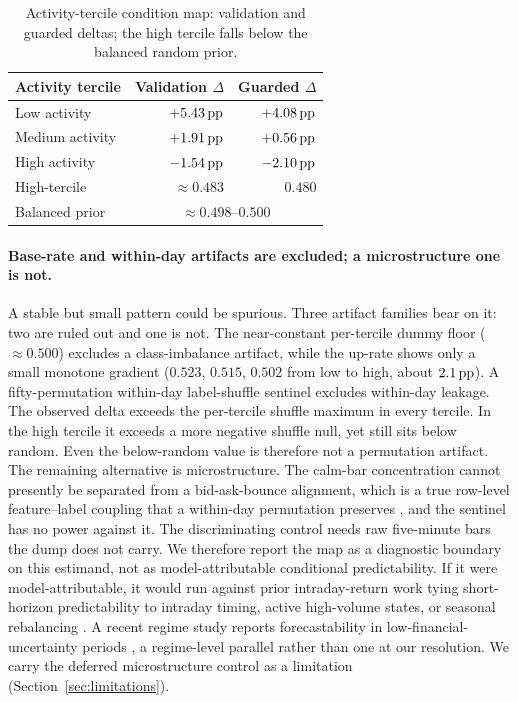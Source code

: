 \begin{table}[t]
  \centering
  \caption{Activity-tercile condition map: validation and guarded \macrofone{}
  deltas; the high tercile falls below the balanced random prior.}
  \label{tab:tercile}
  \begin{tabular}{lrr}
    \toprule
    Activity tercile & Validation $\Delta$ & Guarded $\Delta$ \\
    \midrule
    Low activity    & $+5.43\,\textrm{pp}$ & $+4.08\,\textrm{pp}$ \\
    Medium activity & $+1.91\,\textrm{pp}$ & $+0.56\,\textrm{pp}$ \\
    High activity   & $-1.54\,\textrm{pp}$ & $-2.10\,\textrm{pp}$ \\
    \midrule
    High-tercile \macrofone{} & $\approx 0.483$ & $0.480$ \\
    Balanced prior & \multicolumn{2}{c}{$\approx 0.498$--$0.500$} \\
    \bottomrule
  \end{tabular}
\end{table}

\paragraph{Base-rate and within-day artifacts are excluded; a microstructure one is not.}
A stable but small pattern could be spurious. Three artifact families bear on it:
two are ruled out and one is not. The
near-constant per-tercile dummy floor ($\approx 0.500$) excludes a class-imbalance
artifact, while the up-rate shows only a small monotone gradient ($0.523$, $0.515$,
$0.502$ from low to high, about $2.1\,\textrm{pp}$). A fifty-permutation within-day label-shuffle sentinel
excludes within-day leakage. The observed delta exceeds the per-tercile shuffle
maximum in every tercile. In the high tercile it exceeds a more negative shuffle
null, yet still sits below random. Even the below-random value is
therefore not a permutation artifact. The remaining alternative is microstructure. The
calm-bar concentration cannot presently be separated from a bid-ask-bounce
alignment, which is a true row-level feature--label coupling that a within-day
permutation preserves \cite{roll1984simple,lo1990nonsynchronous}, and the
sentinel has no power against it. The discriminating control needs raw five-minute
bars the dump does not carry. We therefore report the map as a diagnostic
boundary on this estimand, not as model-attributable conditional predictability.
If it were model-attributable, it would run against prior intraday-return work
tying short-horizon predictability to intraday timing, active high-volume states,
or seasonal rebalancing
\cite{heston2010intraday,henkel2011timevarying,bogousslavsky2016infrequent}. A
recent regime study reports forecastability in low-financial-uncertainty periods
\cite{ferrer2023forecast}, a regime-level parallel rather than one at our
resolution. We carry the deferred microstructure control as a limitation
(Section~\ref{sec:limitations}).

